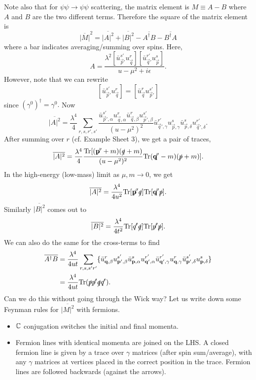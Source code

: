 Note also that for $\psi\psi\to\psi\psi$ scattering, the matrix element is $M\equiv A-B$ where $A$ and $B$ are the two different terms. Therefore the square of the matrix element is
$$\overline{|M|}^2=\overline{|A|^2}+\overline{|B|^2}-\overline{A^\dagger B}- \overline{B^\dagger A}$$
where a bar indicates averaging/summing over spins. Here,
$$A=\frac{\lambda^2 [\bar u_{\vec p'}^{s'} u_{\vec q}^r][\bar u_{\vec q'}^{r'}u_{\vec p}^s]}{u-\mu^2+i\epsilon}.$$
However, note that we can rewrite 
$$[\bar u_{\vec p'}^{s'} u_{\vec q}^r]=[\bar u_{\vec q}^r u_{\vec p'}^{s'}]$$
since $(\gamma^0)^\dagger = \gamma^0.$
Now
$$\overline{|A|^2}=\frac{\lambda^4}{4}\sum_{r,s,r',s'}\frac{\bar u_{\vec p',\alpha}^{s'} u_{\vec q,\alpha}^r \bar u_{\vec q,\beta}^r u_{\vec p',\beta}^{s'}}{(u-\mu^2)^2}\bar u_{\vec q',\gamma}^{r'}u_{\vec p, \gamma}^s \bar u_{\vec p,\delta}^s u_{\vec q',\delta}^{r'}.$$
After summing over $r$ (cf. Example Sheet 3), we get a pair of traces,
$$\overline{|A|^2}=\frac{\lambda^4}{4}\frac{\text{Tr}[(\slashed{\vec p'}+m)(\slashed{q}+m)}{(u-\mu^2)^2}\text{Tr}(\slashed{\vec q'}-m)(\slashed{p}+m)].$$
In the high-energy (low-mass) limit as $\mu,m\to 0$, we get
$$\overline{|A|^2}=\frac{\lambda^4}{4u^2}\text{Tr}[\slashed{\vec p'}\slashed{q}]\text{Tr}[\slashed{\vec q'}\slashed{p}].$$
Similarly $\overline{|B|^2}$ comes out to
$$\overline{|B|^2}=\frac{\lambda^4}{4t^2}\text{Tr}[\slashed{q'}\slashed{q}]\text{Tr}[\slashed{p'}\slashed{p}].$$
We can also do the same for the cross-terms to find
\begin{align*}
    \overline{A^\dagger B}&=\frac{\lambda^4}{4ut} \sum_{r,s,s'r'}\{\bar u_{\boldsymbol{\mathbf{q}},\beta}^r u_{\boldsymbol{\mathbf{p}}',\beta}^{s'} \bar u_{\boldsymbol{\mathbf{p}},\alpha}^s u_{\boldsymbol{\mathbf{q}}',\alpha}^{r'} \bar u_{\boldsymbol{\mathbf{q}}',\gamma}^{r'} u_{\boldsymbol{\mathbf{q}},\gamma}^r \bar u_{\boldsymbol{\mathbf{p}}',\delta}^{s'}u_{\boldsymbol{\mathbf{p}},\delta}^s\}\\
    &=\frac{\lambda^4}{4ut}\text{Tr}(\slashed{p}\slashed{p'}\slashed{q}\slashed{q'}).
\end{align*}
Can we do this without going through the Wick way? Let us write down some Feynman rules for $\overline{|M|^2}$ with fermions.
\begin{itemize}
    \item $\mathbb{C}$ conjugation switches the initial and final momenta.
    \item Fermion lines with identical momenta are joined on the LHS. A closed fermion line is given by a trace over $\gamma$ matrices (after spin sum/average), with any $\gamma$ matrices at vertices placed in the correct position in the trace. Fermion lines are followed backwards (against the arrows).
\end{itemize}
